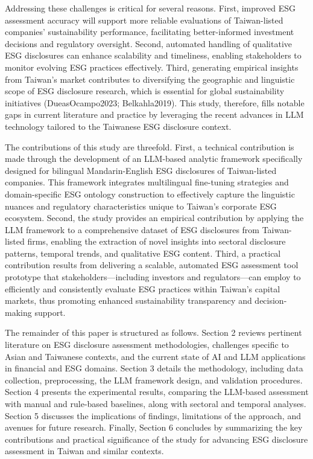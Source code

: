 \documentclass[
  12pt,
]{article}
\begin{document}
Addressing these challenges is critical for several reasons. First,
improved ESG assessment accuracy will support more reliable evaluations
of Taiwan-listed companies' sustainability performance, facilitating
better-informed investment decisions and regulatory oversight. Second,
automated handling of qualitative ESG disclosures can enhance
scalability and timeliness, enabling stakeholders to monitor evolving
ESG practices effectively. Third, generating empirical insights from
Taiwan's market contributes to diversifying the geographic and
linguistic scope of ESG disclosure research, which is essential for
global sustainability initiatives (DueasOcampo2023; Belkahla2019). This
study, therefore, fills notable gaps in current literature and practice
by leveraging the recent advances in LLM technology tailored to the
Taiwanese ESG disclosure context.

The contributions of this study are threefold. First, a technical
contribution is made through the development of an LLM-based analytic
framework specifically designed for bilingual Mandarin-English ESG
disclosures of Taiwan-listed companies. This framework integrates
multilingual fine-tuning strategies and domain-specific ESG ontology
construction to effectively capture the linguistic nuances and
regulatory characteristics unique to Taiwan's corporate ESG ecosystem.
Second, the study provides an empirical contribution by applying the LLM
framework to a comprehensive dataset of ESG disclosures from
Taiwan-listed firms, enabling the extraction of novel insights into
sectoral disclosure patterns, temporal trends, and qualitative ESG
content. Third, a practical contribution results from delivering a
scalable, automated ESG assessment tool prototype that
stakeholders---including investors and regulators---can employ to
efficiently and consistently evaluate ESG practices within Taiwan's
capital markets, thus promoting enhanced sustainability transparency and
decision-making support.

The remainder of this paper is structured as follows. Section 2 reviews
pertinent literature on ESG disclosure assessment methodologies,
challenges specific to Asian and Taiwanese contexts, and the current
state of AI and LLM applications in financial and ESG domains. Section 3
details the methodology, including data collection, preprocessing, the
LLM framework design, and validation procedures. Section 4 presents the
experimental results, comparing the LLM-based assessment with manual and
rule-based baselines, along with sectoral and temporal analyses. Section
5 discusses the implications of findings, limitations of the approach,
and avenues for future research. Finally, Section 6 concludes by
summarizing the key contributions and practical significance of the
study for advancing ESG disclosure assessment in Taiwan and similar
contexts.
\end{document}

